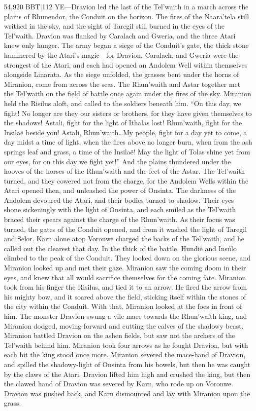 \documentclass[smalldemyvopaper,11pt,twoside,onecolumn,openright,extrafontsizes]{memoir}
\begin{document}
54,920 BBT|112 YE—Dravion led the last of the Tel’waith in a march across the plains of Rhunendor, the Conduit on the horizon. The fires of the Naara’tela still writhed in the sky, and the sight of Taregil still burned in the eyes of the Tel’waith. Dravion was flanked by Caralach and Gweria, and the three Atari knew only hunger. The army began a siege of the Conduit’s gate, the thick stone hammered by the Atari’s magic—for Dravion, Caralach, and Gweria were the strongest of the Atari, and each had opened an Andolem Well within themselves alongside Linarata. As the siege unfolded, the grasses bent under the horns of Miranion, come from across the seas. The Rhun’waith and Astar together met the Tel’waith on the field of battle once again under the fires of the sky. Miranion held the Risilus aloft, and called to the soldiers beneath him.
	“On this day, we fight! No longer are they our sisters or brothers, for they have given themselves to the shadows! Astali, fight for the light of Ithalas lost! Rhun’waith, fight for the Insilaë beside you! Astali, Rhun’waith…My people, fight for a day yet to come, a day midst a time of light, when the fires above no longer burn, when from the ash springs leaf and grass, a time of the Insilaë! May the light of Tolas shine yet from our eyes, for on this day we fight yet!”
	And the plains thundered under the hooves of the horses of the Rhun’waith and the feet of the Astar. The Tel’waith turned, and they cowered not from the charge, for the Andolem Wells within the Atari opened then, and unleashed the power of Onsinta. The darkness of the Andolem devoured the Atari, and their bodies turned to shadow. Their eyes shone sickeningly with the light of Onsinta, and each smiled as the Tel’waith braced their spears against the charge of the Rhun’waith. As their focus was turned, the gates of the Conduit opened, and from it washed the light of Taregil and Selor. Karn alone atop Voronwe charged the backs of the Tel’waith, and he called out the clearest that day.
	In the thick of the battle, Hundië and Insúlo climbed to the peak of the Conduit. They looked down on the glorious scene, and Miranion looked up and met their gaze. Miranion saw the coming doom in their eyes, and knew that all would sacrifice themselves for the coming fate. Miranion took from his finger the Risilus, and tied it to an arrow. He fired the arrow from his mighty bow, and it soared above the field, sticking itself within the stones of the city within the Conduit. With that, Miranion looked at the foes in front of him. The monster Dravion swung a vile mace towards the Rhun’waith king, and Miranion dodged, moving forward and cutting the calves of the shadowy beast. Miranion battled Dravion on the ashen fields, but saw not the archers of the Tel’waith behind him. Miranion took four arrows as he fought Dravion, but with each hit the king stood once more. Miranion severed the mace-hand of Dravion, and spilled the shadowy-light of Onsinta from his bowels, but then he was caught by the claws of the Atari. Dravion lifted him high and crushed the king, but then the clawed hand of Dravion was severed by Karn, who rode up on Voronwe. Dravion was pushed back, and Karn dismounted and lay with Miranion upon the grass.
\end{document}
